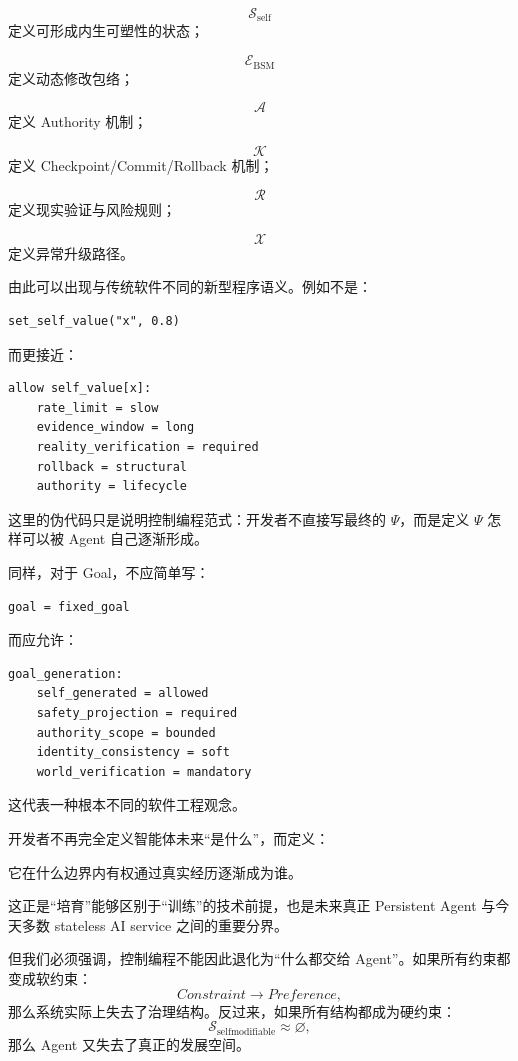 \[
\mathcal S_{\mathrm{self}}
\]
定义可形成内生可塑性的状态；

\[
\mathcal E_{\mathrm{BSM}}
\]
定义动态修改包络；

\[
\mathcal A
\]
定义 Authority 机制；

\[
\mathcal K
\]
定义 Checkpoint/Commit/Rollback 机制；

\[
\mathcal R
\]
定义现实验证与风险规则；

\[
\mathcal X
\]
定义异常升级路径。

由此可以出现与传统软件不同的新型程序语义。例如不是：

\begin{verbatim}
set_self_value("x", 0.8)
\end{verbatim}

而更接近：

\begin{verbatim}
allow self_value[x]:
    rate_limit = slow
    evidence_window = long
    reality_verification = required
    rollback = structural
    authority = lifecycle
\end{verbatim}

这里的伪代码只是说明控制编程范式：开发者不直接写最终的 $\Psi$，而是定义 $\Psi$ 怎样可以被 Agent 自己逐渐形成。

同样，对于 Goal，不应简单写：
\begin{verbatim}
goal = fixed_goal
\end{verbatim}
而应允许：
\begin{verbatim}
goal_generation:
    self_generated = allowed
    safety_projection = required
    authority_scope = bounded
    identity_consistency = soft
    world_verification = mandatory
\end{verbatim}

这代表一种根本不同的软件工程观念。

开发者不再完全定义智能体未来“是什么”，而定义：
\begin{definition*}
它在什么边界内有权通过真实经历逐渐成为谁。
\end{definition*}

这正是“培育”能够区别于“训练”的技术前提，也是未来真正 Persistent Agent 与今天多数 stateless AI service 之间的重要分界。

但我们必须强调，控制编程不能因此退化为“什么都交给 Agent”。如果所有约束都变成软约束：
\[
Constraint\rightarrow Preference,
\]
那么系统实际上失去了治理结构。反过来，如果所有结构都成为硬约束：
\[
\mathcal S_{\mathrm{selfmodifiable}}
\approx\varnothing,
\]
那么 Agent 又失去了真正的发展空间。


